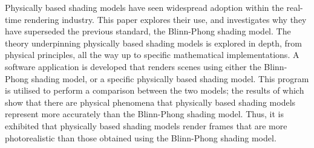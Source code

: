 \justifying

\noindent Physically based shading models have seen widespread adoption within the real-time rendering industry. This paper explores their use, and investigates why they have superseded the previous standard, the Blinn-Phong shading model. The theory underpinning physically based shading models is explored in depth, from physical principles, all the way up to specific mathematical implementations. A software application is developed that renders scenes using either the Blinn-Phong shading model, or a specific physically based shading model. This program is utilised to perform a comparison between the two models; the results of which show that there are physical phenomena that physically based shading models represent more accurately than the Blinn-Phong shading model. Thus, it is exhibited that physically based shading models render frames that are more photorealistic than those obtained using the Blinn-Phong shading model.